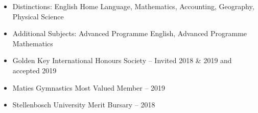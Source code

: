 \documentclass[10pt,a4paper]{altacv}
\begin{document}
\begin{itemize}
    \setlength{\itemindent}{0.5em}
    \item   \small{Distinctions: English Home Language, Mathematics, Accounting, Geography, Physical Science}
    \item   \small{Additional Subjects: Advanced Programme English, Advanced Programme Mathematics}
\end{itemize}

\begin{itemize}
    \setlength{\itemindent}{0.5em}
    \item \small{Golden Key International Honours Society -- Invited 2018 \& 2019 and accepted 2019}
    \item \small{Maties Gymnastics Most Valued Member -- 2019} 
    \item \small{Stellenbosch University Merit Bursary -- 2018}
\end{itemize}


\end{document}
